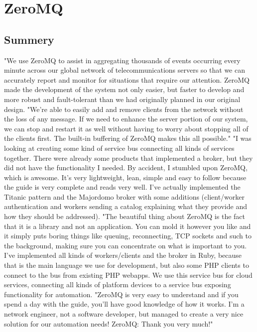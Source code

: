 \chapter{ZeroMQ}
 
\section{Summery}

"We use ZeroMQ to assist in aggregating thousands of events occurring every minute across our global
network of telecommunications servers so that we can accurately report and monitor for situations that
require our attention. ZeroMQ made the development of the system not only easier, but faster to develop
and more robust and fault-tolerant than we had originally planned in our original design.
"We’re able to easily add and remove clients from the network without the loss of any message. If we
need to enhance the server portion of our system, we can stop and restart it as well without having to
worry about stopping all of the clients ﬁrst. The built-in buffering of ZeroMQ makes this all possible."
"I was looking at creating some kind of service bus connecting all kinds of services together. There were
already some products that implemented a broker, but they did not have the functionality I needed. By
accident, I stumbled upon ZeroMQ, which is awesome. It’s very lightweight, lean, simple and easy to
follow because the guide is very complete and reads very well. I’ve actually implemented the Titanic
pattern and the Majordomo broker with some additions (client/worker authentication and workers
sending a catalog explaining what they provide and how they should be addressed).
"The beautiful thing about ZeroMQ is the fact that it is a library and not an application. You can mold it
however you like and it simply puts boring things like queuing, reconnecting, TCP sockets and such to
the background, making sure you can concentrate on what is important to you. I’ve implemented all
kinds of workers/clients and the broker in Ruby, because that is the main language we use for
development, but also some PHP clients to connect to the bus from existing PHP webapps. We use this
service bus for cloud services, connecting all kinds of platform devices to a service bus exposing
functionality for automation.
"ZeroMQ is very easy to understand and if you spend a day with the guide, you’ll have good knowledge
of how it works. I’m a network engineer, not a software developer, but managed to create a very nice
solution for our automation needs! ZeroMQ: Thank you very much!"

